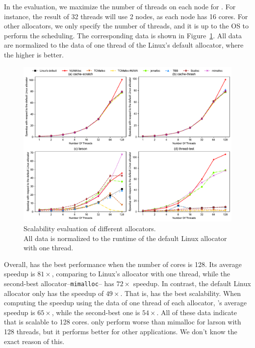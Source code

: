 In the evaluation, we maximize the number of threads on each node for \NM{}. For instance, the result of 32 threads will use 2 nodes, as each node has 16 cores. For other allocators, we only specify the number of threads, and it is up to the OS to perform the scheduling. The corresponding data is shown in Figure~\ref{sythentic-scalability}. All data are normalized to the data of one thread of the Linux's default allocator, where the higher is better.  

\begin{figure}[!th]
    \centering
    \includegraphics[width=\textwidth]{figure/sythentic-scalobility-new.pdf}
    \caption{Scalability evaluation of different allocators.\\ All data is normalized to the runtime of the default Linux allocator with one thread.}
    \label{sythentic-scalability}
\end{figure}

Overall, \NM{} has the best performance when the number of cores is 128. Its average speedup is $81\times$, comparing to Linux's allocator with one thread, while the second-best allocator--\texttt{mimalloc}-- has $72\times$ speedup. In contrast, the default Linux allocator only has the speedup of $49\times$. That is, \NM{} has the best scalability. When computing the speedup using the data of one thread of each allocator, \NM{}'s average speedup is $65\times$, while the second-best one is $54\times$. All of these data indicate that \NM{} is scalable to 128 cores. \NM{} only perform worse than mimalloc for larson with 128 threads, but it performs better for other applications. We don't know the exact reason of this.  


